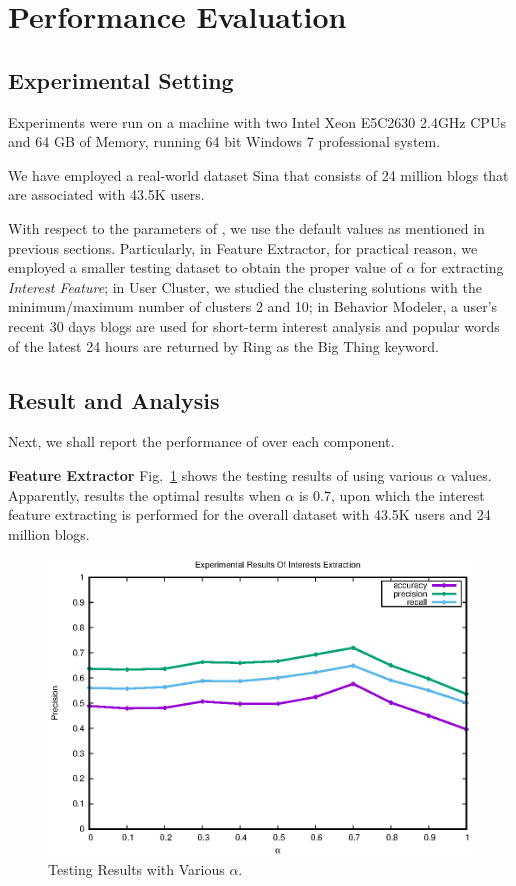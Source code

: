\section{Performance Evaluation}
\label{sec:perf}

\subsection{Experimental Setting}

Experiments were run on a machine with two Intel Xeon E5C2630 2.4GHz CPUs and 64 GB of Memory, running 64 bit Windows 7 professional system.

We have employed a real-world dataset Sina  that consists of 24 million blogs that are associated with 43.5K users.

With respect to the parameters of \sys{}, we use the default values as mentioned in previous sections.
Particularly, in Feature Extractor, for practical reason, we employed a smaller testing dataset to obtain the proper value of $\alpha$ for extracting \textit{Interest Feature};
in User Cluster, we studied the clustering solutions with the minimum/maximum number of clusters 2 and 10;
in Behavior Modeler, a user's recent 30 days blogs are used for short-term interest analysis and popular words of the latest 24 hours are returned by Ring  as the Big Thing keyword.

\subsection{Result and Analysis}
Next, we shall report the performance of \sys{} over each component.

\textbf{Feature Extractor}
%
Fig.\ \ref{fig:fe} shows the testing results of using various $\alpha$ values.
Apparently, \sys{} results the optimal results when $\alpha$ is 0.7, upon which the interest feature extracting is performed for the overall dataset with 43.5K users and 24 million blogs.

\begin{figure}[!htb]
\centering
\includegraphics[width=.7\linewidth]{figures/Interests}
\caption{Testing Results with Various $\alpha$.}
\label{fig:fe}
\end{figure}


